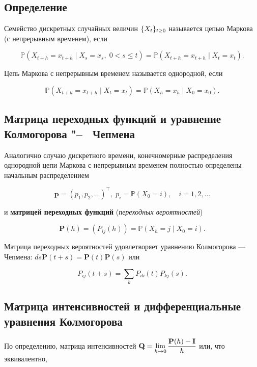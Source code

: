 \documentclass{article}
\begin{document}
\subsection{Определение}
Семейство дискретных случайных величин ${\displaystyle\{X_{t}\}_{t\geq 0}}$ называется цепью Маркова (с непрерывным временем), если

\begin{equation*}
	{\mathbb  {P}}(X_{{t+h}}=x_{{t+h}}\mid X_{s}=x_{s},\;0<s\leq t)={\mathbb  {P}}(X_{{t+h}}=x_{{t+h}}\mid X_{t}=x_{t}).
\end{equation*}

Цепь Маркова с непрерывным временем называется однородной, если

\begin{equation*}
	{\mathbb  {P}}(X_{{t+h}}=x_{{t+h}}\mid X_{t}=x_{t})={\mathbb  {P}}(X_{{h}}=x_{{h}}\mid X_{0}=x_{0}).
\end{equation*}

\subsection{Матрица переходных функций и уравнение Колмогорова "--~ Чепмена}
Аналогично случаю дискретного времени, конечномерные распределения однородной цепи Маркова с непрерывным временем полностью определены начальным распределением

\begin{equation*}
	{\mathbf  {p}}=(p_{1},p_{2},\ldots )^{{\top }},\;p_{i}={\mathbb  {P}}(X_{0}=i),\quad i=1,2,\ldots 
\end{equation*}

и {\bfseries матрицей переходных функций} (\textit{переходных вероятностей})

\begin{equation*}
	{\mathbf  {P}}(h)=(P_{{ij}}(h))={\mathbb  {P}}(X_{h}=j\mid X_{0}=i). 
\end{equation*}

Матрица переходных вероятностей удовлетворяет уравнению Колмогорова — Чепмена: ${ds\mathbf {P} (t+s)=\mathbf {P} (t)\mathbf {P} (s)}$ или

\begin{equation*}
	P_{{ij}}(t+s)=\sum _{k}P_{{ik}}(t)P_{{kj}}(s). 
\end{equation*}

\subsection{Матрица интенсивностей и дифференциальные уравнения Колмогорова}
По определению, матрица интенсивностей ${\displaystyle \mathbf {Q} =\lim _{h\to 0}{\frac {\mathbf {P} (h)-\mathbf {I} }{h}}}$ или, что эквивалентно,
\end{document}
